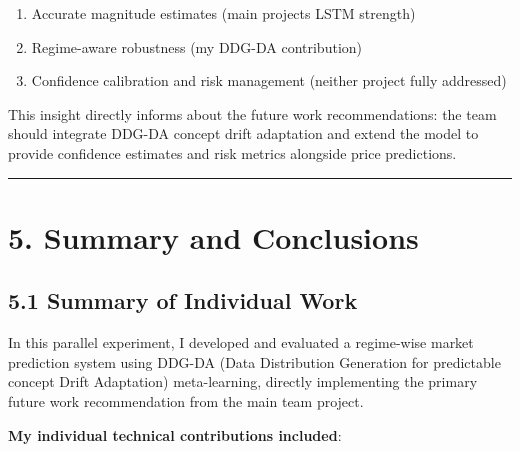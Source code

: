 \documentclass[
]{article}
\begin{document}
\begin{enumerate}
\def\labelenumi{\arabic{enumi}.}
\item
  Accurate magnitude estimates (main project\textquotesingle s LSTM
  strength)
\item
  Regime-aware robustness (my DDG-DA contribution)
\item
  Confidence calibration and risk management (neither project fully
  addressed)
\end{enumerate}

This insight directly informs about the future work recommendations: the
team should integrate DDG-DA concept drift adaptation and extend the
model to provide confidence estimates and risk metrics alongside price
predictions.

\begin{center}\rule{0.5\linewidth}{0.5pt}\end{center}

\section{5. Summary and Conclusions}\label{5-summary-and-conclusions}

\subsection{5.1 Summary of Individual
Work}\label{51-summary-of-individual-work}

In this parallel experiment, I developed and evaluated a regime-wise
market prediction system using DDG-DA (Data Distribution Generation for
predictable concept Drift Adaptation) meta-learning, directly
implementing the primary future work recommendation from the main team
project.

\textbf{My individual technical contributions included}:
\end{document}
